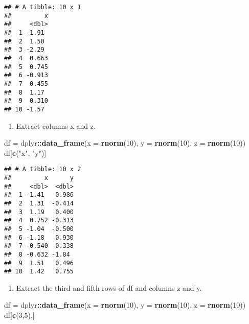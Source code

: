 \documentclass[]{article}
\newenvironment{Shaded}{\begin{snugshade}}{\end{snugshade}}
\newcommand{\DataTypeTok}[1]{\textcolor[rgb]{0.13,0.29,0.53}{#1}}
\newcommand{\DecValTok}[1]{\textcolor[rgb]{0.00,0.00,0.81}{#1}}
\newcommand{\KeywordTok}[1]{\textcolor[rgb]{0.13,0.29,0.53}{\textbf{#1}}}
\newcommand{\NormalTok}[1]{#1}
\newcommand{\OperatorTok}[1]{\textcolor[rgb]{0.81,0.36,0.00}{\textbf{#1}}}
\newcommand{\StringTok}[1]{\textcolor[rgb]{0.31,0.60,0.02}{#1}}
\providecommand{\tightlist}{%
  \setlength{\itemsep}{0pt}\setlength{\parskip}{0pt}}
\begin{document}
\begin{verbatim}
## # A tibble: 10 x 1
##         x
##     <dbl>
##  1 -1.91 
##  2  1.50 
##  3 -2.29 
##  4  0.663
##  5  0.745
##  6 -0.913
##  7  0.455
##  8  1.17 
##  9  0.310
## 10 -1.57
\end{verbatim}

\begin{enumerate}
\def\labelenumi{\alph{enumi}.}
\setcounter{enumi}{2}
\tightlist
\item
  Extract columns x and z.
\end{enumerate}

\begin{Shaded}
\begin{Highlighting}[]
\NormalTok{df =}\StringTok{ }\NormalTok{dplyr}\OperatorTok{::}\KeywordTok{data_frame}\NormalTok{(}\DataTypeTok{x =} \KeywordTok{rnorm}\NormalTok{(}\DecValTok{10}\NormalTok{), }\DataTypeTok{y =} \KeywordTok{rnorm}\NormalTok{(}\DecValTok{10}\NormalTok{), }\DataTypeTok{z =} \KeywordTok{rnorm}\NormalTok{(}\DecValTok{10}\NormalTok{)) }
\NormalTok{df[}\KeywordTok{c}\NormalTok{(}\StringTok{"x"}\NormalTok{, }\StringTok{"y"}\NormalTok{)]}
\end{Highlighting}
\end{Shaded}

\begin{verbatim}
## # A tibble: 10 x 2
##         x      y
##     <dbl>  <dbl>
##  1 -1.41   0.986
##  2  1.31  -0.414
##  3  1.19   0.400
##  4  0.752 -0.313
##  5 -1.04  -0.500
##  6 -1.18   0.930
##  7 -0.540  0.338
##  8 -0.632 -1.84 
##  9  1.51   0.496
## 10  1.42   0.755
\end{verbatim}

\begin{enumerate}
\def\labelenumi{\alph{enumi}.}
\setcounter{enumi}{3}
\tightlist
\item
  Extract the third and fifth rows of df and columns z and y.
\end{enumerate}

\begin{Shaded}
\begin{Highlighting}[]
\NormalTok{df =}\StringTok{ }\NormalTok{dplyr}\OperatorTok{::}\KeywordTok{data_frame}\NormalTok{(}\DataTypeTok{x =} \KeywordTok{rnorm}\NormalTok{(}\DecValTok{10}\NormalTok{), }\DataTypeTok{y =} \KeywordTok{rnorm}\NormalTok{(}\DecValTok{10}\NormalTok{), }\DataTypeTok{z =} \KeywordTok{rnorm}\NormalTok{(}\DecValTok{10}\NormalTok{)) }
\NormalTok{df[}\KeywordTok{c}\NormalTok{(}\DecValTok{3}\NormalTok{,}\DecValTok{5}\NormalTok{),]}
\end{Highlighting}
\end{Shaded}
\end{document}

